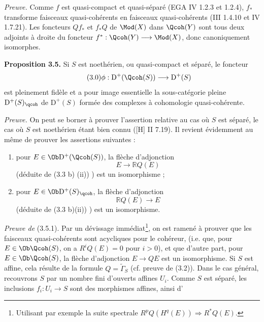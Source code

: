 \emph{Preuve.} Comme $f$ est quasi-compact et quasi-séparé (EGA IV 1.2.3 et 1.2.4), $f_*$ transforme faisceaux quasi-cohérents en faisceaux quasi-cohérents (III 1.4.10 et IV 1.7.21). Les foncteurs $Qf_*$ et $f_*Q$ de $\Mod(X)$ dans $\Qcoh(Y)$ sont tous deux adjoints à droite du foncteur $f^*:\Qcoh(Y)\longrightarrow\Mod(X)$, donc canoniquement isomorphes.

\textbf{Proposition 3.5.} Si $S$ est noethérien, ou quasi-compact et séparé, le foncteur
\begin{equation}\tag{3.0}
 \phi:\mathrm D^+(\Qcoh(S))\longrightarrow \mathrm D^+(S)
\end{equation}
est pleinement fidèle et a pour image essentielle la sous-catégorie pleine $\mathrm D^+(S)_{\qcoh}$ de $\mathrm D^+(S)$ formée des complexes à cohomologie quasi-cohérente.

\emph{Preuve.} On peut se borner à prouver l'assertion relative au cas où $S$ est séparé, le cas où $S$ est noethérien étant bien connu ([H] II 7.19). Il revient évidemment au même de prouver les assertions suivantes :

\begin{enumerate}[label={(3.5.\arabic*)~:}]
\item pour $E\in\Ob\mathrm D^+(\Qcoh(S))$, la flèche d'adjonction
\[
 E\longrightarrow \mathbb RQ(E)
\]
(déduite de (3.3 b) (ii)) ) est un isomorphisme ;
\item pour $E\in\Ob\mathrm D^+(S)_{\qcoh}$, la flèche d'adjonction
\[
 \mathbb RQ(E)\longrightarrow E
\]
(déduite de (3.3 b)(ii)) ) est un isomorphisme.
\end{enumerate}

\emph{Preuve de} (3.5.1). Par un dévissage immédiat\footnote{Utilisant par exemple la suite spectrale $R^pQ(H^q(E))\Longrightarrow R^{*}Q(E)$.}, on est ramené à prouver que les faisceaux quasi-cohérents sont acycliques pour le cohéreur, (i.e. que, pour $E\in\Ob\Qcoh(S)$, on a $R^iQ(E)=0$ pour $i>0$), et que d'autre part, pour $E\in\Ob\Qcoh(S)$, la flèche d'adjonction $E\longrightarrow QE$ est un isomorphisme. Si $S$ est affine, cela résulte de la formule $Q=\widetilde{\Gamma}_S$ (cf. preuve de (3.2)). Dans le cas général, recouvrons $S$ par un nombre fini d'ouverts affines $U_i$. Comme $S$ est séparé, les inclusions $f_i:U_i\longrightarrow S$ sont des morphismes affines, ainsi d'%
